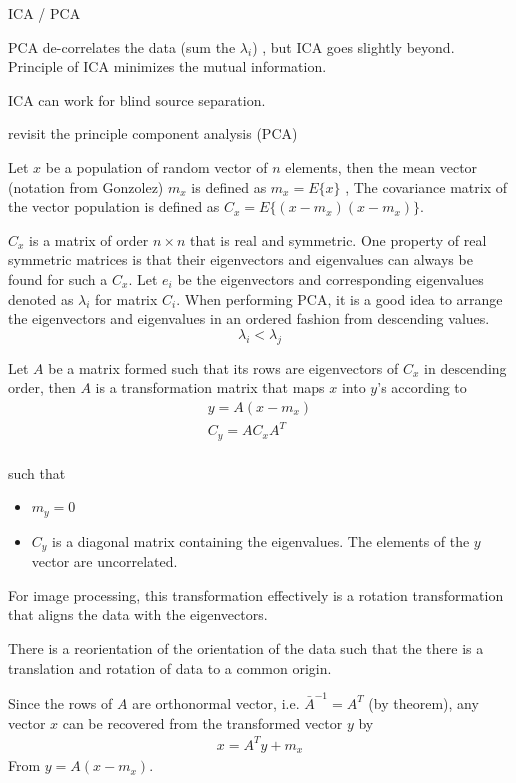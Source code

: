ICA / PCA 

PCA de-correlates the data  (sum the $\lambda_i$)  , but ICA goes slightly beyond.  Principle of ICA minimizes the mutual information.  

ICA can work for blind source separation.  

revisit the principle component analysis (PCA) 

Let $x$ be a population of random vector of $n$ elements, then the mean vector (notation from Gonzolez) $m_x$ is defined as $m_x = E \{ x \}$ ,  The covariance matrix of the vector population is defined as $C_x = E \{ (x-m_x)(x- m_x)\}$.   

$C_x$ is a matrix of order $n \times n$ that is real and symmetric.   One property of real symmetric matrices is that their eigenvectors and eigenvalues can always be found for such a $C_x$.   Let $e_i$ be the eigenvectors and corresponding eigenvalues denoted as $\lambda_i$ for matrix $C_i$.   When performing PCA, it is a good idea to arrange the eigenvectors and eigenvalues in an ordered fashion from descending values.  
\[ 
\lambda_i < \lambda_j
\] 

Let $A$ be a matrix formed such that its rows are eigenvectors of $C_x$ in descending order, then $A$ is a transformation matrix that maps $x$ into $y$'s according to 
\begin{eqnarray}
	y = A ( x - m_x) \\
	C_y = A C_x A^T \\
\end{eqnarray}

such that 
\begin{itemize}
	\item $m_y = 0$
	\item $C_y$ is a diagonal matrix containing the eigenvalues.  The elements of the $y$ vector are uncorrelated.
\end{itemize}
For image processing, this transformation effectively is a rotation transformation that aligns the data with the eigenvectors.   

There is a reorientation of the orientation of the data such that the there is a translation and rotation of data to a common origin.  

Since the rows of $A$ are orthonormal vector, i.e. $\bar{A}^{-1} = A^T$ (by theorem), any vector $x$ can be recovered from the transformed vector $y$  by 
\begin{eqnarray}
	x = A^T y  + m_x
\end{eqnarray}
From $y= A(x - m_x)$.

